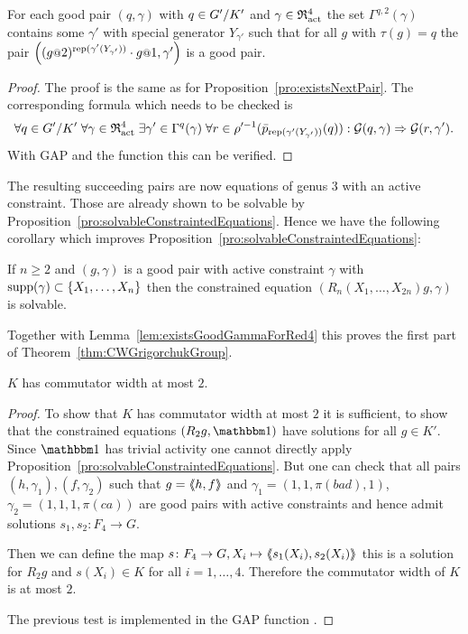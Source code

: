 \documentclass[a4paper,11pt]{amsart}
\begin{document}
\begin{pro}\label{pro:existsNextPair4}
 For each good pair $(q,\gamma)$ with $q\in{G'/K'}$ and $\gamma\in\mathfrak{R}^4_{\operatorname{act}}$ the set 
  $\Gamma^{q,2}(\gamma)$
 contains some $\gamma'$ with special generator $Y_{\gamma'}$ such that for all $g$ with $\tau(g)=q$ the
 pair $\left((g\at{2})^{\rep(\gamma'(Y_{\gamma'}))}\cdot g\at{1},\gamma'\right)$ is a good pair.
\end{pro}
\begin{proof}
The proof is the same as for Proposition~\ref{pro:existsNextPair}. The corresponding formula which needs to be checked is 
\[\forall q\in{G'/K'}\;
      \forall \gamma\in\mathfrak{R}^4_{\operatorname{act}}\;
	 \exists \gamma'\in \Gamma^q(\gamma)\;
	    \forall r\in \rho'^{-1}(\bar p_{\operatorname{rep}(\gamma'(Y_{\gamma'}))}(q)):
	      \mathcal{G}(q,\gamma) \Rightarrow \mathcal{G}(r,\gamma').\]
 With GAP and the function  this can be verified. 
\end{proof}
The resulting succeeding pairs are now equations of genus $3$ with an active constraint. 
Those are already shown to be solvable 
by Proposition~\ref{pro:solvableConstraintedEquations}. Hence we have the following
corollary which improves Proposition~\ref{pro:solvableConstraintedEquations}:
\begin{cor}\label{cor:solvableConstraintedEquations}
If $n\geq2$ and $(g,\gamma)$ is a good pair with active constraint $\gamma$ with $\operatorname{{supp}}(\gamma)\subset\{X_1,\dotsc,X_{n}\}$
 then the constrained equation $(R_n(X_1,\dotsc,X_{2n})g,\gamma)$ is solvable. 
\end{cor}
Together with Lemma~\ref{lem:existsGoodGammaForRed4} this proves the first part of Theorem~\ref{thm:CWGrigorchukGroup}.
\begin{cor}\label{cor:KhasCW2}
 $K$ has commutator width at most $2$. 
\end{cor}
\begin{proof}
 To show that $K$ has commutator width at most $2$ it is sufficient, to show that 
 the constrained equations $(R_2g,\id)$ have solutions for all $g\in K'$. 
 Since $\id$ has trivial activity one cannot directly apply 
 Proposition~\ref{pro:solvableConstraintedEquations}.  But one can check that all 
 pairs $(h,\gamma_1),(f,\gamma_2)$ such that $g=\langle\negthickspace\langle h,f\rangle\negthickspace\rangle$ and
 $\gamma_1=(1,1,\pi(bad),1)$, $\gamma_2=(1,1,1,\pi(ca))$ are good pairs with active
 constraints and hence admit solutions $s_1,s_2\colon F_4\to G$.
 
 Then we can define the map $s\colon F_4\to G, X_i\mapsto \langle\negthickspace\langle s_1(X_i),s_2(X_i)\rangle\negthickspace\rangle$ this is a solution
 for $R_2g$ and $s(X_i)\in K$ for all $i=1,\dotsc,4$. Therefore the commutator width of $K$ is at most $2$.
 
 The previous test is implemented in the GAP function . 
\end{proof}
\end{document}
